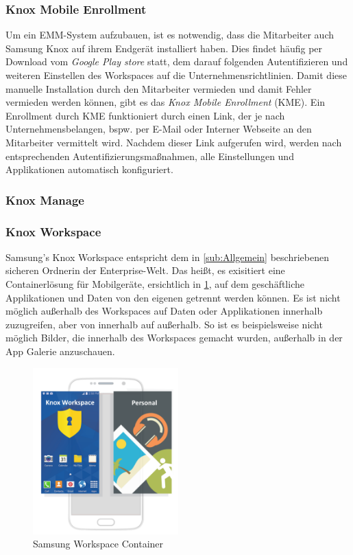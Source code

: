 \subsubsection{Knox Mobile Enrollment}
Um ein EMM-System aufzubauen, ist es notwendig, dass die Mitarbeiter auch Samsung Knox auf ihrem Endgerät installiert haben. Dies findet häufig per Download vom \textit{Google Play store} statt, dem darauf folgenden Autentifizieren und weiteren Einstellen des Workspaces auf die Unternehmensrichtlinien. 
Damit diese manuelle Installation durch den Mitarbeiter vermieden und damit Fehler vermieden werden können, gibt es das \textit{Knox Mobile Enrollment} (KME). Ein Enrollment durch KME funktioniert durch einen Link, der je nach Unternehmensbelangen, bspw. per E-Mail oder Interner Webseite an den Mitarbeiter vermittelt wird. Nachdem dieser Link aufgerufen wird, werden nach entsprechenden Autentifizierungsmaßnahmen, alle Einstellungen und Applikationen automatisch konfiguriert.

\subsubsection{Knox Manage}

\subsubsection{Knox Workspace}
Samsung's Knox Workspace entspricht dem in \cref{sub:Allgemein} beschriebenen \flqq sicheren Ordner\frqq in der Enterprise-Welt. Das heißt, es exisitiert eine Containerlösung für Mobilgeräte, ersichtlich in \cref{fig:SamKno2}, auf dem geschäftliche Applikationen und Daten von den eigenen getrennt werden können. Es ist nicht möglich außerhalb des Workspaces auf Daten oder Applikationen innerhalb zuzugreifen, aber von innerhalb auf außerhalb. So ist es beispielsweise nicht möglich Bilder, die innerhalb des Workspaces gemacht wurden, außerhalb in der App Galerie anzuschauen.
\begin{figure}[hbt]
\centering
\includegraphics[width=0.5\textwidth]{Bilder/sk_2}
\caption{Samsung Workspace Container}\label{fig:SamKno2}
\end{figure}

